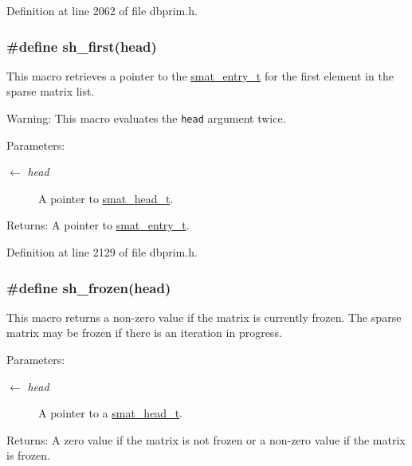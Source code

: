 Definition at line 2062 of file dbprim.h.\hypertarget{group__dbprim__smat_ga49}{
\subsubsection[sh\_\-first]{\setlength{\rightskip}{0pt plus 5cm}\#define sh\_\-first(head)}}
\label{group__dbprim__smat_ga49}


This macro retrieves a pointer to the \hyperlink{group__dbprim__smat_ga2}{smat\_\-entry\_\-t} for the first element in the sparse matrix list.

\begin{Desc}
\item[Warning:]This macro evaluates the {\tt head} argument twice.\end{Desc}
\begin{Desc}
\item[Parameters:]
\begin{description}
\item[\mbox{$\leftarrow$} {\em head}]A pointer to \hyperlink{group__dbprim__smat_ga1}{smat\_\-head\_\-t}.\end{description}
\end{Desc}
\begin{Desc}
\item[Returns:]A pointer to \hyperlink{group__dbprim__smat_ga2}{smat\_\-entry\_\-t}.\end{Desc}


Definition at line 2129 of file dbprim.h.\hypertarget{group__dbprim__smat_ga46}{
\subsubsection[sh\_\-frozen]{\setlength{\rightskip}{0pt plus 5cm}\#define sh\_\-frozen(head)}}
\label{group__dbprim__smat_ga46}


This macro returns a non-zero value if the matrix is currently frozen. The sparse matrix may be frozen if there is an iteration in progress.

\begin{Desc}
\item[Parameters:]
\begin{description}
\item[\mbox{$\leftarrow$} {\em head}]A pointer to a \hyperlink{group__dbprim__smat_ga1}{smat\_\-head\_\-t}.\end{description}
\end{Desc}
\begin{Desc}
\item[Returns:]A zero value if the matrix is not frozen or a non-zero value if the matrix is frozen.\end{Desc}


